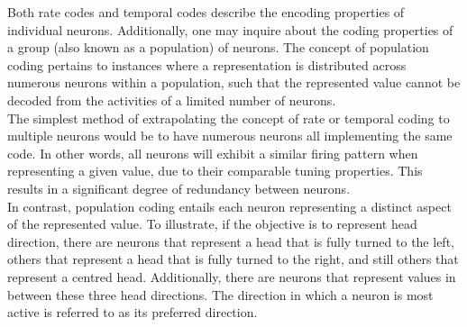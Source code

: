 


\noindent Both rate codes and temporal codes describe the encoding properties of individual neurons. Additionally, one may inquire about the coding properties of a group (also known as a population) of neurons. The concept of population coding pertains to instances where a representation is distributed across numerous neurons within a population, such that the represented value cannot be decoded from the activities of a limited number of neurons.\\

\noindent The simplest method of extrapolating the concept of rate or temporal coding to multiple neurons would be to have numerous neurons all implementing the same code. In other words, all neurons will exhibit a similar firing pattern when representing a given value, due to their comparable tuning properties. This results in a significant degree of redundancy between neurons. \\

\noindent In contrast, population coding entails each neuron representing a distinct aspect of the represented value. To illustrate, if the objective is to represent head direction, there are neurons that represent a head that is fully turned to the left, others that represent a head that is fully turned to the right, and still others that represent a centred head. Additionally, there are neurons that represent values in between these three head directions. The direction in which a neuron is most active is referred to as its preferred direction. \\

